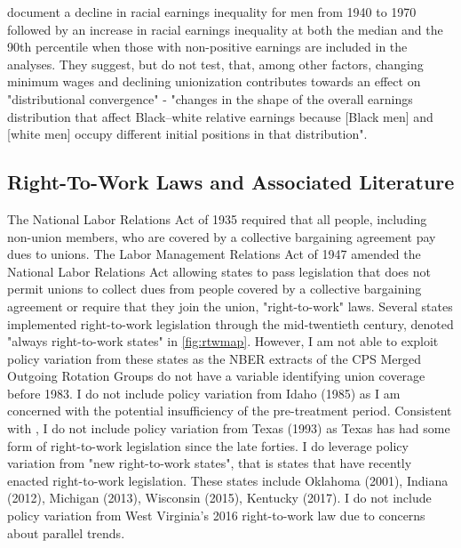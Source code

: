 \documentclass[11pt]{article}
\begin{document}
\citet{bayercharles2018} document a decline in racial earnings inequality for men from 1940 to 1970 followed by an increase in racial earnings inequality at both the median and the 90th percentile when those with non-positive earnings are included in the analyses. They suggest, but do not test, that, among other factors, changing minimum wages and declining unionization contributes towards an effect on "distributional convergence" - "changes in the shape of the overall earnings distribution that affect Black–white relative earnings because [Black men] and [white men] occupy different initial positions in that distribution".


\subsection{Right-To-Work Laws and Associated Literature}
The National Labor Relations Act of 1935 required that all people, including non-union members, who are covered by a collective bargaining agreement pay dues to unions. The Labor Management Relations Act of 1947 amended the National Labor Relations Act allowing states to pass legislation that does not permit unions to collect dues from people covered by a collective bargaining agreement or require that they join the union, "right-to-work" laws. Several states implemented right-to-work legislation through the mid-twentieth century, denoted "always right-to-work states" in \autoref{fig:rtwmap}. However, I am not able to exploit policy variation from these states as the NBER extracts of the CPS Merged Outgoing Rotation Groups do not have a variable identifying union coverage before 1983. I do not include policy variation from Idaho (1985) as I am concerned with the potential insufficiency of the pre-treatment period. Consistent with \citet{fll2018}, I do not include policy variation from Texas (1993) as Texas has had some form of right-to-work legislation since the late forties. I do leverage policy variation from "new right-to-work states", that is states that have recently enacted right-to-work legislation. These states include Oklahoma (2001), Indiana (2012), Michigan (2013), Wisconsin (2015), Kentucky (2017). I do not include policy variation from West Virginia's 2016 right-to-work law due to concerns about parallel trends. 
\end{document}
